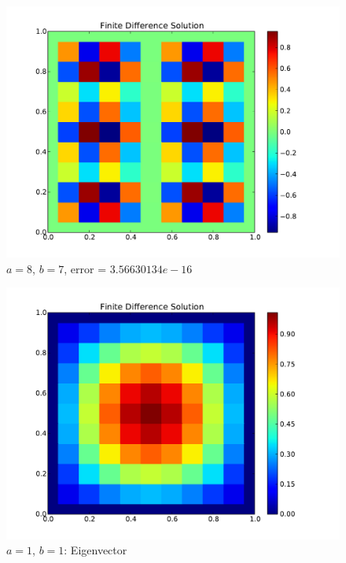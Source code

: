 \documentclass[10pt,letterpaper]{article}
\begin{document}
\begin{figure}[p]
\begin{center}
\includegraphics[width=5in,keepaspectratio]{a87.pdf}
\end{center}
\caption{$a=8$, $b=7$, error = $3.56630134e-16$}
\end{figure}

\begin{figure}[p]
\begin{center}
\includegraphics[width=5in,keepaspectratio]{b11.pdf}
\end{center}
\caption{$a=1$, $b=1$: Eigenvector}
\end{figure}
\end{document}
